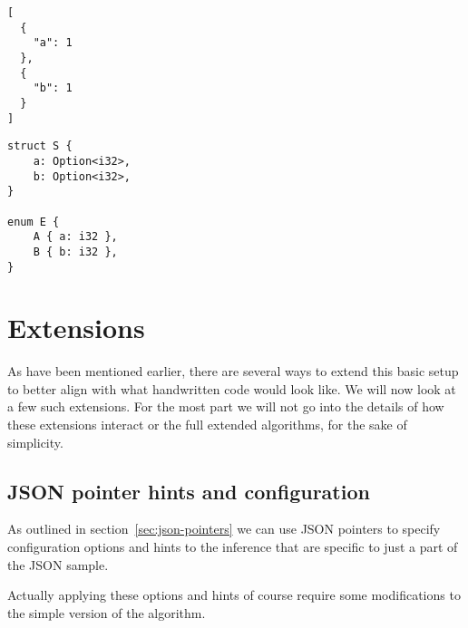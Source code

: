 


\begin{listing}[ht!]
\begin{verbatim}
[
  {
    "a": 1
  },
  {
    "b": 1
  }
]
\end{verbatim}
\caption{JSON Dilemma \#1}
\label{lst:json-dilemma-1}
\end{listing}

\begin{listing}[ht!]
\begin{verbatim}
struct S {
    a: Option<i32>,
    b: Option<i32>,
}

enum E {
    A { a: i32 },
    B { b: i32 },
}
\end{verbatim}
\caption{JSON Dilemma \#1 - Two solutions}
\label{lst:json-dilemma-1-rs}
\end{listing}

\section{Extensions}
\label{sec:extensions}

As have been mentioned earlier, there are several ways to extend this basic setup to better align with what handwritten code would look like. We will now look at a few such extensions. For the most part we will not go into the details of how these extensions interact or the full extended algorithms, for the sake of simplicity.


\subsection{JSON pointer hints and configuration}

As outlined in section~\ref{sec:json-pointers} we can use JSON pointers to specify configuration options and hints to the inference that are specific to just a part of the JSON sample.

Actually applying these options and hints of course require some modifications to the simple version of the algorithm.


